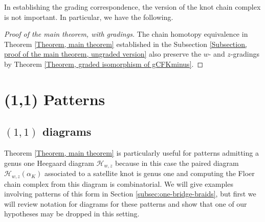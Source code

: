 \documentclass{amsart}
\theoremstyle{definition}
\theoremstyle{remark}
\numberwithin{equation}{section}
\numberwithin{equation}{section} \makeatletter
\begin{document}
In establishing the grading correspondence, the version of the knot chain complex is not important. In particular, we have the following.
\begin{proof}[Proof of the main theorem, with gradings]
	The chain homotopy equivalence in Theorem \ref{Theorem, main theorem} established in the Subsection \ref{Subsection, proof of the main theorem, ungraded version} also preserve the $w$- and $z$-gradings by Theorem \ref{Theorem, graded isomorphism of gCFKminus}. 
\end{proof}



\section{(1,1) Patterns}\label{Section, examples}


\subsection{$(1,1)$ diagrams }\label{Subsection, 1 1 diagrams}
Theorem \ref{Theorem, main theorem} is particularly useful for patterns admitting a genus one Heegaard diagram $\mathcal{H}_{w,z}$ because in this case the paired diagram $\mathcal{H}_{w,z}(\alpha_K)$ associated to a satellite knot is genus one and computing the Floer chain complex from this diagram is combinatorial. We will give examples involving patterns of this form in Section \ref{subsec:one-bridge-braids}, but first we will review notation for diagrams for these patterns and show that one of our hypotheses may be dropped in this setting.
\end{document}
